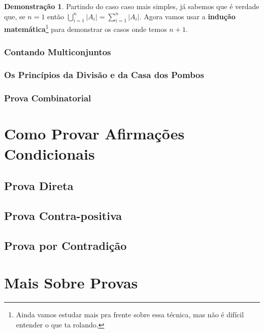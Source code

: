 \documentclass[a4paper,11pt]{book}
\theoremstyle{definition}
\theoremstyle{break}
\newtheorem{demonstration}{Demonstração}[section]
\begin{document}
\begin{demonstration}
Partindo do caso caso mais simples, já sabemos que é verdade que, se $n = 1$ então $\displaystyle \bigcup_{i = 1}^{n} |A_i| =  \sum_{i = 1}^{n} |A_i|$. Agora vamos usar a \textbf{indução matemática}\footnote{Ainda vamos estudar mais pra frente sobre essa técnica, mas não é difícil entender o que ta rolando.} para demonstrar os casos onde temos $n + 1$.
\end{demonstration}


\section{Contando Multiconjuntos}
\section{Os Princípios da Divisão e da Casa dos Pombos}
\section{Prova Combinatorial}

\part{Como Provar Afirmações Condicionais}

\chapter{Prova Direta}

\chapter{Prova Contra-positiva}

\chapter{Prova por Contradição}


\part{Mais Sobre Provas}
\end{document}

